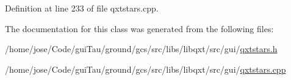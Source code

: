 Definition at line 233 of file qxtstars.\-cpp.



The documentation for this class was generated from the following files\-:\begin{DoxyCompactItemize}
\item 
/home/jose/\-Code/gui\-Tau/ground/gcs/src/libs/libqxt/src/gui/\hyperlink{qxtstars_8h}{qxtstars.\-h}\item 
/home/jose/\-Code/gui\-Tau/ground/gcs/src/libs/libqxt/src/gui/\hyperlink{qxtstars_8cpp}{qxtstars.\-cpp}\end{DoxyCompactItemize}
